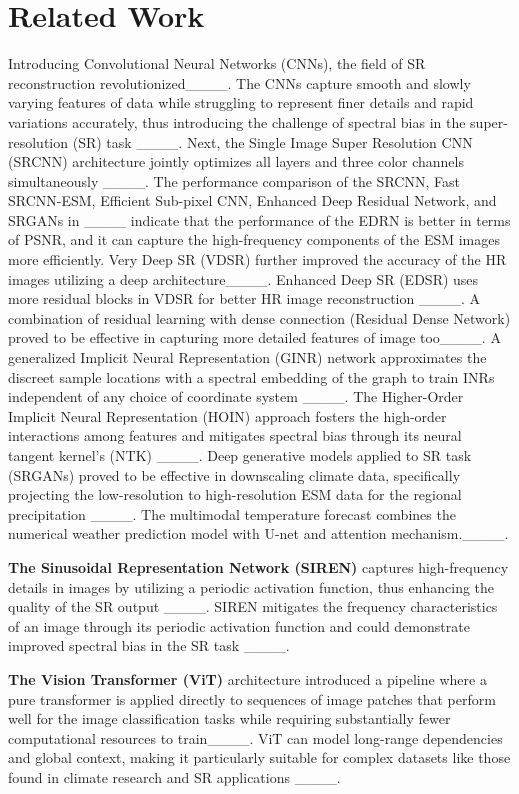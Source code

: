 \section{Related Work}
\label{sec-related}
Introducing Convolutional Neural Networks (CNNs), the field of SR reconstruction revolutionized____. The CNNs capture smooth and slowly varying features of data while struggling to represent finer details and rapid variations accurately, thus introducing the challenge of spectral bias in the super-resolution (SR) task ____. Next, the Single Image Super Resolution CNN (SRCNN) architecture jointly optimizes all layers and three color channels simultaneously ____. The performance comparison of the SRCNN, Fast SRCNN-ESM, Efficient Sub-pixel CNN, Enhanced Deep Residual Network, and SRGANs in ____ indicate that the performance of the EDRN is better in terms of PSNR, and it can capture the high-frequency components of the ESM images more efficiently. Very Deep SR (VDSR) further improved the accuracy of the HR images utilizing a deep architecture____. Enhanced Deep SR (EDSR) uses more residual blocks in VDSR for better HR image reconstruction ____. A combination of residual learning with dense connection (Residual Dense Network) proved to be effective in capturing more detailed features of image too____. A generalized Implicit Neural Representation (GINR) network approximates the discreet sample locations with a spectral embedding of the graph to train INRs independent of any choice of coordinate system ____. The Higher-Order Implicit Neural Representation (HOIN) approach fosters the high-order interactions among features and mitigates spectral bias through its neural tangent kernel's (NTK) ____. Deep generative models applied to SR task (SRGANs) proved to be effective in downscaling climate data, specifically projecting the low-resolution to high-resolution ESM data for the regional precipitation ____. The multimodal temperature forecast combines the numerical weather prediction model with U-net and attention mechanism.____.

\noindent \textbf{The Sinusoidal Representation Network (SIREN)} captures high-frequency details in images by utilizing a periodic activation function, thus enhancing the quality of the SR output ____. SIREN mitigates the frequency characteristics of an image through its periodic activation function and could demonstrate improved spectral bias in the SR task ____. 

\noindent \textbf{The Vision Transformer (ViT)} architecture introduced a pipeline where a pure transformer is applied directly to sequences of image patches that perform well for the image classification tasks while requiring substantially fewer computational resources to train____. ViT can model long-range dependencies and global context, making it particularly suitable for complex datasets like those found in climate research and SR applications ____.


